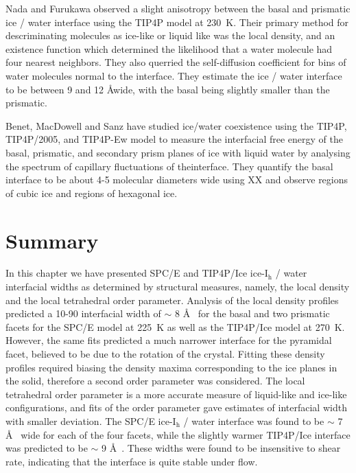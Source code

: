Nada and Furukawa observed a slight anisotropy between the basal and
prismatic ice / water interface using the TIP4P model at 230~K. Their primary
method for descriminating molecules as ice-like or liquid like was the
local density, and an existence function which determined the
likelihood that a water molecule had four nearest neighbors. They also
querried the self-diffusion coefficient for bins of water molecules
normal to the interface. They estimate the ice / water interface to be
between 9 and 12 \AA wide, with the basal being slightly smaller than
the prismatic.\cite{Nada1995}

Benet, MacDowell and Sanz have studied ice/water coexistence using the
TIP4P, TIP4P/2005, and TIP4P-Ew model to measure the interfacial free
energy of the basal, prismatic, and secondary prism planes of ice with
liquid water by analysing the spectrum of capillary fluctuations of
theinterface. They quantify the basal interface to be about 4-5
molecular diameters wide using XX and observe regions of cubic ice and
regions of hexagonal ice. \cite{Benet2014}


\section{Summary}
In this chapter we have presented SPC/E and TIP4P/Ice
ice-I$_\mathrm{h}$ / water interfacial widths as determined by
structural measures, namely, the local density and the local
tetrahedral order parameter. Analysis of the local density profiles
predicted a 10-90 interfacial width of $\sim$ 8 \AA~ for the basal and
two prismatic facets for the SPC/E model at 225~K as well as the
TIP4P/Ice model at 270~K. However, the same fits predicted a much
narrower interface for the pyramidal facet, believed to be due to the
rotation of the crystal. Fitting these density profiles required
biasing the density maxima corresponding to the ice planes in the
solid, therefore a second order parameter was considered. The local
tetrahedral order parameter is a more accurate measure of liquid-like
and ice-like configurations, and fits of the order parameter gave
estimates of interfacial width with smaller deviation. The SPC/E
ice-I$_\mathrm{h}$ / water interface was found to be $\sim$ 7 \AA~
wide for each of the four facets, while the slightly warmer TIP4P/Ice
interface was predicted to be $\sim$ 9 \AA~. These widths were found
to be insensitive to shear rate, indicating that the interface is
quite stable under flow.
